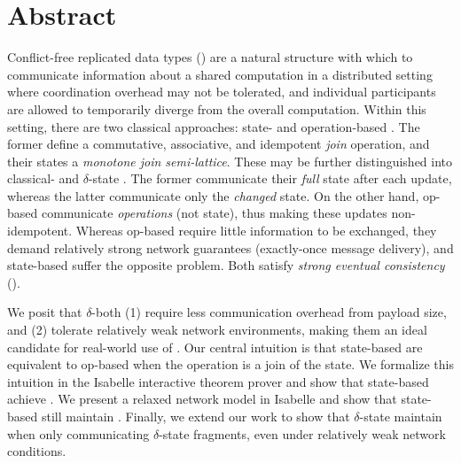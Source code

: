 \chapter*{Abstract}

Conflict-free replicated data types (\CRDTs) are a natural structure with which
to communicate information about a shared computation in a distributed setting
where coordination overhead may not be tolerated, and individual participants
are allowed to temporarily diverge from the overall computation.  Within this
setting, there are two classical approaches: state- and operation-based \CRDTs.
The former define a commutative, associative, and idempotent \textit{join}
operation, and their states a \textit{monotone join semi-lattice}. These may be
further distinguished into classical- and $\delta$-state
\CRDTs. The former communicate their \emph{full} state after
each update, whereas the latter communicate only the \emph{changed} state. On
the other hand, op-based \CRDTs communicate \emph{operations} (not state), thus
making these updates non-idempotent.  Whereas op-based \CRDTs require little
information to be exchanged, they demand relatively strong network guarantees
(exactly-once message delivery), and state-based \CRDTs suffer the opposite
problem. Both satisfy \textit{strong eventual consistency} (\SEC).

We posit that $\delta$-\CRDTs both (1) require less communication overhead
from payload size, and (2) tolerate relatively weak network environments, making
them an ideal candidate for real-world use of \CRDTs. Our central intuition is
that state-based \CRDTs are equivalent to op-based \CRDTs when the operation is
a join of the state. We formalize this intuition in the Isabelle interactive
theorem prover and show that state-based \CRDTs achieve \SEC. We present a
relaxed network model in Isabelle and show that state-based \CRDTs still
maintain \SEC. Finally, we extend our work to show that $\delta$-state \CRDTs
maintain \SEC when only communicating $\delta$-state fragments, even under
relatively weak network conditions.
